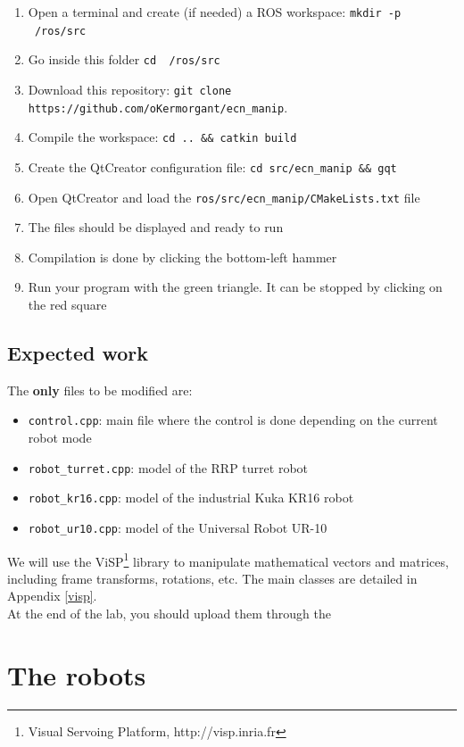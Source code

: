\documentclass{ecnreport}
\begin{document}
  \begin{enumerate}
    \item Open a terminal and create (if needed) a ROS workspace: \texttt{mkdir -p ~/ros/src}
    \item Go inside this folder \texttt{cd ~/ros/src}
    \item Download this repository: \texttt{git clone https://github.com/oKermorgant/ecn\_manip}.
    \item Compile the workspace: \texttt{cd .. \&\& catkin build}
    \item Create the QtCreator configuration file: \texttt{cd src/ecn\_manip \&\& gqt}
    \item Open QtCreator and load the \texttt{ros/src/ecn\_manip/CMakeLists.txt} file
    \item The files should be displayed and ready to run
    \item Compilation is done by clicking the bottom-left hammer
    \item Run your program with the green triangle. It can be stopped by clicking on the red square
  \end{enumerate}
  
  \subsection{Expected work}
  
  The {\bf only} files to be modified are:
  \begin{itemize}
    \item \texttt{control.cpp}: main file where the control is done depending on the current robot mode
    \item \texttt{robot\_turret.cpp}: model of the RRP turret robot
    \item \texttt{robot\_kr16.cpp}: model of the industrial Kuka KR16 robot
    \item \texttt{robot\_ur10.cpp}: model of the Universal Robot UR-10
  \end{itemize}
  We will use the ViSP\footnote{Visual Servoing Platform, http://visp.inria.fr} library to manipulate mathematical vectors and matrices, including frame transforms, rotations, etc. The main classes are detailed in Appendix \ref{visp}.\\
  At the end of the lab, you should upload them through the 
  
  \section{The robots}
  
\end{document}

